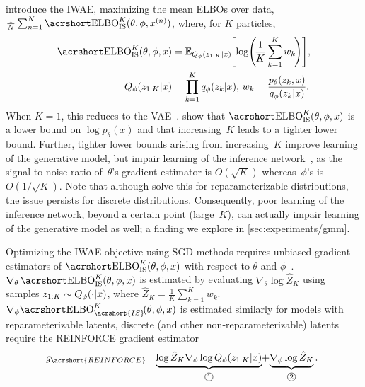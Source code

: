 \citet{Burda2016importance} introduce the \gls{IWAE}, maximizing the mean \glspl{ELBO} over data, $\frac{1}{N} \sum_{n = 1}^N \ELBO_{\text{IS}}^K(\theta, \phi, x^{(n)})$, where, for $K$ particles,
\begin{align}
  \label{eq:elbo_is}
  \ELBO_{\text{IS}}^K(\theta, \phi, x)
  &= \E_{Q_\phi(z_{1:K} \given x)}
    \!\!\left[ \log\!\left(\!\frac{1}{K} \sum_{k = 1}^K w_k \!\right)\right]\!,\\
  Q_\phi(z_{1:K} \given x)
  &= \prod_{k = 1}^K q_\phi(z_k \given x), \,w_k = \frac{p_\theta(z_k, x)}{q_\phi(z_k \given x)}.
  \nonumber
\end{align}
When $K = 1$, this reduces to the \gls{VAE}~\citep{Kingma2014auto,Rezende2014stochastic}.
\citet{Burda2016importance} show that $\ELBO_{\text{IS}}^K(\theta, \phi, x)$ is a lower bound on $\log p_\theta(x)$ and that increasing~$K$ leads to a tighter lower bound.
Further, tighter lower bounds arising from increasing~$K$ improve learning of the generative model, but impair learning of the inference network~\citep{Rainforth2018tighter}, as the signal-to-noise ratio of~\(\theta\)'s gradient estimator is $O(\sqrt{K})$ whereas~\(\phi\)'s is $O(1 / \sqrt{K})$.
Note that although \citet{Tucker2019doubly} solve this for reparameterizable distributions, the issue persists for discrete distributions.
Consequently, poor learning of the inference network, beyond a certain point (large~\(K\)), can actually impair learning of the generative model as well; a finding we explore in \cref{sec:experiments/gmm}.

Optimizing the \gls{IWAE} objective using \gls{SGD} methods requires unbiased gradient estimators of $\ELBO_{\text{IS}}^K(\theta, \phi, x)$ with respect to $\theta$ and $\phi$~\citep{Robbins1951stochastic}.
$\nabla_\theta \ELBO_{\text{IS}}^K(\theta, \phi, x)$ is estimated by evaluating $\nabla_\theta \log \hat Z_K$ using samples $z_{1:K} \sim Q_\phi(\cdot \lvert x)$, where $\hat Z_K = \frac{1}{K} \sum_{k = 1}^K\! w_k$.
$\nabla_\phi \!\ELBO_{\acrshort{IS}}^K\!(\theta, \phi, x)$ is estimated similarly for models with reparameterizable latents, discrete (and other non-reparameterizable) latents require the \acrshort{REINFORCE} gradient estimator~\citep{Williams1992simple}
\begin{align}
  \!\!\!\!g_{\acrshort{REINFORCE}}
  \!=\! \underbrace{\log \hat Z_K \nabla_\phi \log Q_\phi(z_{1:K} \given x)}_{\circled[5]{1}}
  \!+\! \underbrace{\nabla_\phi \log \hat Z_K}_{\circled[5]{2}}.\!\!
    \label{eq:iwae-reinforce}
\end{align}

